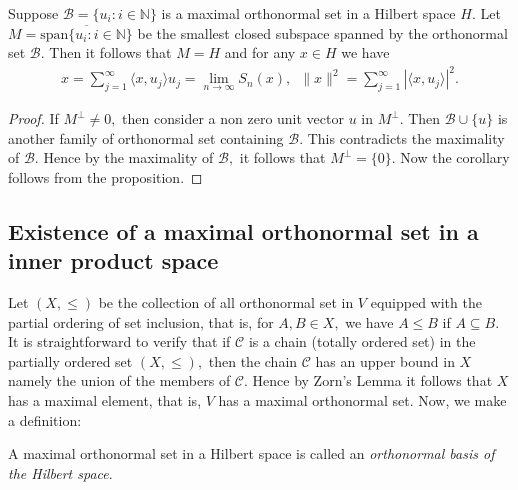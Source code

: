 \begin{corollary}\label{cor:span-closure-of-onb}
    Suppose $\mathcal B = \{u_{i} :  i\in \mathbb N\}$ is a maximal orthonormal set in a Hilbert space $H.$ Let $M= \overline{\text{span} \{u_i: i\in\mathbb N\}}$ be the smallest closed subspace spanned by the orthonormal set $\mathcal B.$ Then it follows that $M=H$ and for any $x\in H$ we have 
\begin{align*}
x= \sum_{j=1}^{\infty} \langle x, u_j\rangle u_j = \lim_{n\to\infty} S_n(x),\,\,\, \|x\|^2= \sum_{j=1}^{\infty} |\langle x, u_j\rangle|^2.
\end{align*}
\end{corollary}
\begin{proof}
If $M^{\perp}\neq 0,$ then consider a non zero unit vector $u$ in $M^{\perp}.$ Then $\mathcal B \cup \{u\}$ is another family of orthonormal set containing $\mathcal B.$ This contradicts the maximality of $\mathcal B.$ Hence by the maximality of $\mathcal B ,$ it follows that $M^{\perp} = \{0\}.$ Now the corollary follows from the proposition.
\end{proof}

\subsection{Existence of a maximal orthonormal set in a inner product space} Let $(X, \leqslant)$ be the collection of all orthonormal set in $V$ equipped with the partial ordering of set inclusion, that is, for $A,B\in X,$ we have $A\leqslant B$ if $A \subseteq B.$ It is straightforward to verify that if $\mathscr C$ is a chain (totally ordered set) in the partially ordered set  $(X,\leqslant),$ then the chain $\mathscr C$ has an upper bound in $X$ namely the union of the members of $\mathscr C.$ Hence by Zorn's Lemma it follows that $X$ has a maximal element, that is, $V$ has a maximal orthonormal set. Now, we make a definition:

\begin{definition}
    \label{def:orthonormal-basis}
    A maximal orthonormal set in a Hilbert space is called an \textit{orthonormal basis of the Hilbert space}. 
\end{definition}

